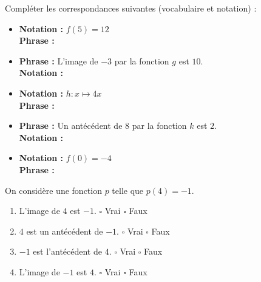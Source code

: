 \documentclass[a4paper]{book}
\begin{document}
    \begin{exercice}
        Compléter les correspondances suivantes (vocabulaire et notation) :
    
        \medskip
        \begin{itemize}[label={$\bullet$}, itemsep=0.8cm]
            \item \textbf{Notation :} $f(5) = 12$ \\[1ex]
                  \textbf{Phrase :} \dotfill
            
            \item \textbf{Phrase :} L'image de $-3$ par la fonction $g$ est $10$. \\[1ex]
                  \textbf{Notation :} \dotfill

\newpage
                  
            \item \textbf{Notation :} $h : x \longmapsto 4x$ \\[1ex]
                  \textbf{Phrase :} \dotfill
                  
            \item \textbf{Phrase :} Un antécédent de $8$ par la fonction $k$ est $2$. \\[1ex]
                  \textbf{Notation :} \dotfill
                  
            \item \textbf{Notation :} $f(0) = -4$ \\[1ex]
                  \textbf{Phrase :} \dotfill
        \end{itemize}
    \end{exercice}

    
    \begin{exercice}
        On considère une fonction $p$ telle que $p(4) = -1$.
        \begin{enumerate}
            \item L'image de $4$ est $-1$. \quad $\square$ Vrai \quad $\square$ Faux
            \item $4$ est un antécédent de $-1$. \quad $\square$ Vrai \quad $\square$ Faux
            \item $-1$ est l'antécédent de $4$. \quad $\square$ Vrai \quad $\square$ Faux
            \item L'image de $-1$ est $4$. \quad $\square$ Vrai \quad $\square$ Faux
        \end{enumerate}
    \end{exercice}
\end{document}
